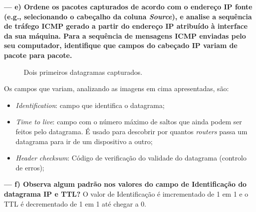 \documentclass[a4paper]{article}
\begin{document}
\newpage

\textbf{--- e) Ordene os pacotes capturados de acordo com o endereço IP fonte (e.g., selecionando o cabeçalho da coluna \textit{Source}), e analise a sequência de tráfego ICMP gerado a partir do endereço IP atribuído à interface da sua máquina. Para a sequência de mensagens ICMP enviadas pelo seu computador, identifique que campos do cabeçado IP variam de pacote para pacote.}\newline
\begin{figure}[h]%
    \centering
    \qquad
    \caption{Dois primeiros datagramas capturados.}%
    \label{fig:example}%
\end{figure}
Os campos que variam, analizando as imagens em cima apresentadas, são:
\begin{itemize}
    \item \textit{Identification}: campo que identifica o datagrama;
    \item \textit{Time to live}: campo com o número máximo de saltos que ainda podem ser feitos pelo datagrama. É usado para descobrir por quantos \textit{routers} passa um datagrama para ir de um dispositivo a outro;
    \item \textit{Header checksum}: Código de verificação do validade do datagrama (controlo de erros);
\end{itemize}

\vspace{1cm}

\textbf{--- f) Observa algum padrão nos valores do campo de Identificação do datagrama IP e TTL?}\newline
O valor de Identificação é imcrementado de 1 em 1 e o TTL é decrementado de 1 em 1 até chegar a 0.
\end{document}

